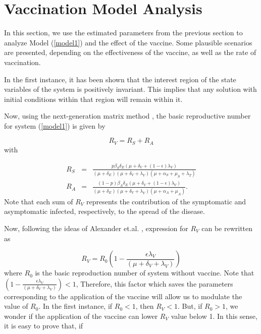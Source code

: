 \documentclass[preprint, sort&compress]{elsarticle}
\begin{document}
\pagebreak 	\section{Vaccination Model Analysis}
In this section, we use the estimated parameters from the previous section to analyze Model (\ref{model1}) and the effect of the vaccine. Some plausible scenarios are presented, depending on the effectiveness of the vaccine,  as well as the rate of vaccination.

In the first instance, it has been shown that the interest region of the state variables of the system is positively invariant. This implies that any solution with initial conditions within that region will remain within it.







Now, using the next-generation matrix method  \cite{Diekmann1990, Van2002}, the basic reproductive number for system (\ref{model1}) is given by









\begin{equation}\label{Rv}
R_{V}=R_S+R_A
\end{equation}
with

\begin{eqnarray*}
R_S&=&\frac{p\beta_S\delta_E(\mu+\delta_V+(1-\epsilon) \lambda_V)}{(\mu+\delta_E)(\mu+\delta_V+\lambda_V)(\mu+\alpha_S+\mu_S+\lambda_T)}\\ 
 R_A&=&\frac{(1-p)\beta_A\delta_E(\mu+\delta_V+(1-\epsilon) \lambda_V)}{(\mu+\delta_E)(\mu+\delta_V+\lambda_V)(\mu+\alpha_A+\mu_A)}.\nonumber
\end{eqnarray*}
 Note that each sum of $ R_ {V} $ represents the contribution of the symptomatic and asymptomatic infected, respectively, to the spread of the disease.

Now, following the ideas of Alexander et.al. \cite{Alexander2004}, expression for $R_V$ can be rewritten as

\begin{equation}\label{Rv2}
R_{V}=R_0\left(1- \frac{\epsilon \lambda_V}{(\mu+\delta_V+\lambda_V)}\right)
\end{equation}
where $R_0$ is the basic reproduction number of system without vaccine. Note that $\left(1- \frac{\epsilon \lambda_V}{(\mu+\delta_V+\lambda_V)}\right)<1$, Therefore, this factor which saves the parameters corresponding to the application of the vaccine will allow us to modulate the value of $ R_0 $. In the first instance, if $ R_0 <1 $, then $ R_V <1 $. But, if $ R_0> 1 $, we wonder if the application of the vaccine can lower $R_V$ value below 1. In this sense, it is easy to prove that, if
\end{document}
